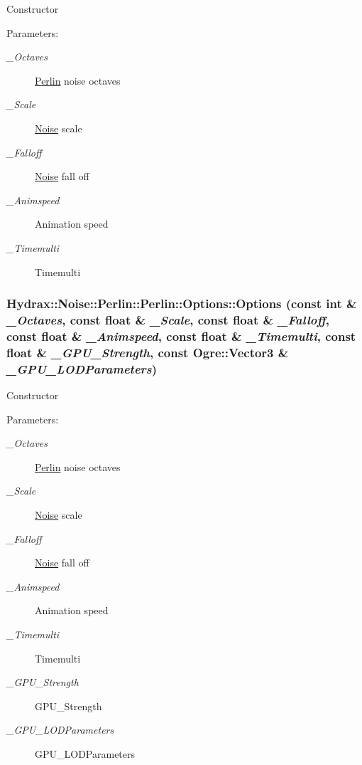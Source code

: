 Constructor \begin{Desc}
\item[Parameters:]
\begin{description}
\item[{\em \_\-Octaves}]\hyperlink{class_hydrax_1_1_noise_1_1_perlin}{Perlin} noise octaves \item[{\em \_\-Scale}]\hyperlink{class_hydrax_1_1_noise_1_1_noise}{Noise} scale \item[{\em \_\-Falloff}]\hyperlink{class_hydrax_1_1_noise_1_1_noise}{Noise} fall off \item[{\em \_\-Animspeed}]Animation speed \item[{\em \_\-Timemulti}]Timemulti \end{description}
\end{Desc}
\hypertarget{struct_hydrax_1_1_noise_1_1_perlin_1_1_options_be063c5cb7eba48426af6edced02fc15}{
\subsubsection[{Options}]{\setlength{\rightskip}{0pt plus 5cm}Hydrax::Noise::Perlin::Perlin::Options::Options (const int \& {\em \_\-Octaves}, \/  const float \& {\em \_\-Scale}, \/  const float \& {\em \_\-Falloff}, \/  const float \& {\em \_\-Animspeed}, \/  const float \& {\em \_\-Timemulti}, \/  const float \& {\em \_\-GPU\_\-Strength}, \/  const Ogre::Vector3 \& {\em \_\-GPU\_\-LODParameters})}}
\label{struct_hydrax_1_1_noise_1_1_perlin_1_1_options_be063c5cb7eba48426af6edced02fc15}


Constructor \begin{Desc}
\item[Parameters:]
\begin{description}
\item[{\em \_\-Octaves}]\hyperlink{class_hydrax_1_1_noise_1_1_perlin}{Perlin} noise octaves \item[{\em \_\-Scale}]\hyperlink{class_hydrax_1_1_noise_1_1_noise}{Noise} scale \item[{\em \_\-Falloff}]\hyperlink{class_hydrax_1_1_noise_1_1_noise}{Noise} fall off \item[{\em \_\-Animspeed}]Animation speed \item[{\em \_\-Timemulti}]Timemulti \item[{\em \_\-GPU\_\-Strength}]GPU\_\-Strength \item[{\em \_\-GPU\_\-LODParameters}]GPU\_\-LODParameters \end{description}
\end{Desc}


